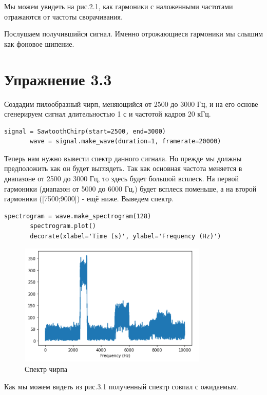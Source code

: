 \documentclass[a4paper,12pt]{report}
\begin{document}
    Мы можем увидеть на рис.2.1, как гармоники с наложенными частотами отражаются от частоты сворачивания. 
    
    Послушаем получившийся сигнал.  
    Именно отрожающиеся гармоники мы слышим как фоновое шипение.     
    
\chapter{Упражнение 3.3}
    Создадим пилообразный чирп, меняющийся от 2500 до 3000 Гц, и на его основе сгенерируем сигнал длительностью 1 с и частотой кадров 20 кГц. 
\begin{lstlisting}[caption=Создание пилообразного чирпа]
       signal = SawtoothChirp(start=2500, end=3000)
       wave = signal.make_wave(duration=1, framerate=20000)
\end{lstlisting}
    
    Теперь нам нужно вывести спектр данного сигнала. Но прежде мы должны предположить как он будет выглядеть. Так как основная частота меняется в диапазоне от 2500 до 3000 Гц, то здесь будет большой всплеск. На первой гармоники (диапазон от 5000 до 6000 Гц,) будет всплеск поменьше, а на второй гармоники ([7500;9000]) - ещё ниже. 
    Выведем спектр.
\begin{lstlisting}[caption=Получение спектра чирпа]
       spectrogram = wave.make_spectrogram(128)
       spectrogram.plot()
       decorate(xlabel='Time (s)', ylabel='Frequency (Hz)')
\end{lstlisting}
\begin{figure}[H]
        \centering
        \includegraphics[width=0.8\textwidth]{fig3-1.PNG}
        \caption{Спектр чирпа}
        \label{fig:fig3-1}
\end{figure}

    Как мы можем видеть из рис.3.1 полученный спектр совпал с ожидаемым.
    
\end{document}
